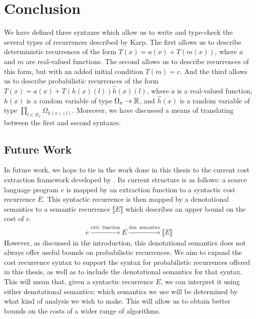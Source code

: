 \chapter{Conclusion}

We have defined three syntaxes which allow us to write and type-check the several types of recurrences
described by Karp. The first allows us to describe deterministic recurrences of the form $T(x) = a(x) + T(m(x))$, where $a$ and $m$ are real-valued functions. The second allows us to describe recurrences of this form, but with an added initial 
condition $T(m) = c$. And the third allows us to describe probabilistic recurrences of the form 
$T(x) = a(x) + T(h(x)(l))\hat{h}(x)(l)$, where $a$ is a real-valued function, $h(x)$ is a random variable of type
$\Omega_x \rightarrow \mathbb{R}$, and $\hat{h}(x)$ is a random variable of type
 $\prod_{l \in \Omega_x} \Omega_{h(x)(l)}$. Moreover, we have discussed a means of translating between
 the first and second syntaxes. 
 
 \section{Future Work}
 In future work, we hope to tie in the work done in this thesis to the current cost extraction framework developed
 by \cite{N.-Danner:2015aa}. Its current structure is as follows: a source language program $e$ is mapped by an 
 extraction function to a syntactic cost recurrence $E$. This syntactic recurrence is then mapped by a denotational
 semantics to a semantic recurrence $\llbracket E \rrbracket$ which describes an upper bound on the cost of $e$. 
 \begin{align*}
 e\xrightarrow{\text{extr. function}}E\xrightarrow{\text{den. semantics}}\llbracket E \rrbracket
 \end{align*}
 However, as discussed in the introduction, this denotational semantics does not always offer useful bounds on 
 probabilistic recurrences. We aim to expand the cost recurrence syntax to support the syntax for 
 probabilistic recurrences offered in this thesis, as well as to include the denotational semantics for that syntax.
 This will mean that, given a syntactic recurrence $E$, we can interpret it using either denotational semantics;
which semantics we use will be determined by what kind of analysis we wish to make. This will allow us to obtain 
better bounds on the costs of a wider range of algorithms.